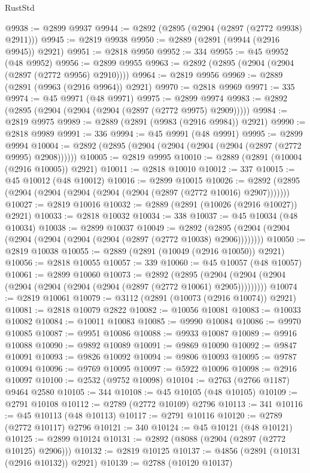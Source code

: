 \begin{lexlean}{RustStd}
\begin{coremodule}
@9938 := @2899 @9937
@9944 := @2892 (@2895 (@2904 (@2897 (@2772 @9938) @2911)))
@9945 := @2819 @9938
@9950 := @2889 (@2891 (@9944 (@2916 @9945)) @2921)
@9951 := @2818 @9950
@9952 := 334
@9955 := @45 @9952 (@48 @9952)
@9956 := @2899 @9955
@9963 := @2892 (@2895 (@2904 (@2904 (@2897 (@2772 @9956) @2910))))
@9964 := @2819 @9956
@9969 := @2889 (@2891 (@9963 (@2916 @9964)) @2921)
@9970 := @2818 @9969
@9971 := 335
@9974 := @45 @9971 (@48 @9971)
@9975 := @2899 @9974
@9983 := @2892 (@2895 (@2904 (@2904 (@2904 (@2897 (@2772 @9975) @2909)))))
@9984 := @2819 @9975
@9989 := @2889 (@2891 (@9983 (@2916 @9984)) @2921)
@9990 := @2818 @9989
@9991 := 336
@9994 := @45 @9991 (@48 @9991)
@9995 := @2899 @9994
@10004 := @2892 (@2895 (@2904 (@2904 (@2904 (@2904 (@2897 (@2772 @9995) @2908))))))
@10005 := @2819 @9995
@10010 := @2889 (@2891 (@10004 (@2916 @10005)) @2921)
@10011 := @2818 @10010
@10012 := 337
@10015 := @45 @10012 (@48 @10012)
@10016 := @2899 @10015
@10026 := @2892 (@2895 (@2904 (@2904 (@2904 (@2904 (@2904 (@2897 (@2772 @10016) @2907)))))))
@10027 := @2819 @10016
@10032 := @2889 (@2891 (@10026 (@2916 @10027)) @2921)
@10033 := @2818 @10032
@10034 := 338
@10037 := @45 @10034 (@48 @10034)
@10038 := @2899 @10037
@10049 := @2892 (@2895 (@2904 (@2904 (@2904 (@2904 (@2904 (@2904 (@2897 (@2772 @10038) @2906))))))))
@10050 := @2819 @10038
@10055 := @2889 (@2891 (@10049 (@2916 @10050)) @2921)
@10056 := @2818 @10055
@10057 := 339
@10060 := @45 @10057 (@48 @10057)
@10061 := @2899 @10060
@10073 := @2892
    (@2895 (@2904 (@2904 (@2904 (@2904 (@2904 (@2904 (@2904 (@2897 (@2772 @10061) @2905)))))))))
@10074 := @2819 @10061
@10079 := @3112 (@2891 (@10073 (@2916 @10074)) @2921)
@10081 := @2818 @10079 @2822
@10082 := @10056 @10081
@10083 := @10033 @10082
@10084 := @10011 @10083
@10085 := @9990 @10084
@10086 := @9970 @10085
@10087 := @9951 @10086
@10088 := @9933 @10087
@10089 := @9916 @10088
@10090 := @9892 @10089
@10091 := @9869 @10090
@10092 := @9847 @10091
@10093 := @9826 @10092
@10094 := @9806 @10093
@10095 := @9787 @10094
@10096 := @9769 @10095
@10097 := @5922 @10096
@10098 := @2916 @10097
@10100 := @2532 (@9752 @10098)
@10104 := @2763 (@2766 @1187) @9464 @2580
@10105 := 344
@10108 := @45 @10105 (@48 @10105)
@10109 := @2791 @10108
@10112 := @2789 (@2772 @10109) @2796
@10113 := 341
@10116 := @45 @10113 (@48 @10113)
@10117 := @2791 @10116
@10120 := @2789 (@2772 @10117) @2796
@10121 := 340
@10124 := @45 @10121 (@48 @10121)
@10125 := @2899 @10124
@10131 := @2892 (@8088 (@2904 (@2897 (@2772 @10125) @2906)))
@10132 := @2819 @10125
@10137 := @4856 (@2891 (@10131 (@2916 @10132)) @2921)
@10139 := @2788 (@10120 @10137)

\end{coremodule}
\end{lexlean}
